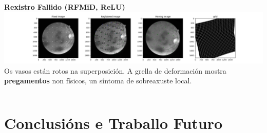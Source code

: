 \documentclass[xcolor=dvipsnames]{beamer}
\begin{document}
\begin{frame}
\begin{columns}
        \begin{column}{0.5\textwidth}
            \centering
            \textbf{Rexistro Fallido (RFMiD, ReLU)}
        \includegraphics[width=\textwidth]{../imaxes/reg_examples/RFMID_MLP_mala.png}
            \vspace{0.2cm}
            Os vasos están rotos na superposición. A grella de deformación mostra \textbf{pregamentos} non físicos, un síntoma de sobreaxuste local.
        \end{column}
    \end{columns}
\end{frame}

\section{Conclusións e Traballo Futuro}
\end{document}
